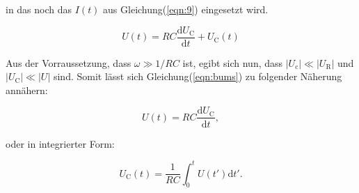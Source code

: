         \noindent in das noch das $I(t)$ aus Gleichung(\ref{eqn:9}) eingesetzt wird.

        \begin{equation}
            U(t) = RC \frac{\text{d}U_{\text{C}}}{\text{d}t} + U_{\text{C}}(t)
            \label{eqn:bums}
        \end{equation}

        \noindent Aus der Vorraussetzung, dass $\omega \gg 1/RC $ ist, egibt sich nun, dass $|U_{\text{c}}| \ll | U_{\text{R}}|$ und 
        $|U_{\text{C}}| \ll |U|$ sind. Somit lässt sich Gleichung(\ref{eqn:bums}) zu folgender Näherung annähern:

        \begin{equation*}
            U(t) = RC \frac{\text{d}U_{\text{C}}}{\text{d}t} ,
        \end{equation*}
        
        \noindent oder in integrierter Form:

        \begin{equation*}
            U_{\text{C}}(t) = \frac{1}{RC} \int_0^t U(t')\text{d}t' .
        \end{equation*}